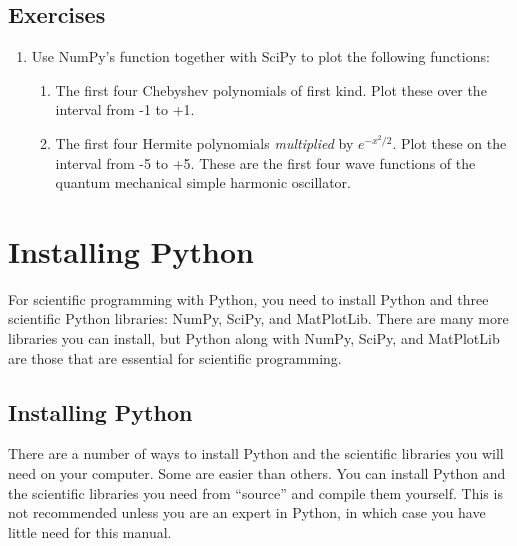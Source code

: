\documentclass[letterpaper,10pt,english]{sphinxmanual}
\begin{document}
\section{Exercises}
\label{chap9/chap9_scipy:exercises}\begin{enumerate}
\item {} 
Use NumPy's  function together with SciPy to plot the following functions:
\begin{enumerate}
\item {} 
The first four Chebyshev polynomials of first kind.  Plot these over the interval from -1 to +1.

\item {} 
The first four Hermite polynomials  \emph{multiplied} by \(e^{-x^2/2}\).  Plot these on the interval from -5 to +5.  These are the first four wave functions of the quantum mechanical simple harmonic oscillator.

\end{enumerate}

\end{enumerate}

\appendix
{}\label{apdx1/apdx1_install::doc}

\chapter{Installing Python}
\label{apdx1/apdx1_install:apdx1}\label{apdx1/apdx1_install:installing-python}
For scientific programming with Python, you need to install Python and three scientific Python libraries: NumPy, SciPy, and MatPlotLib.  There are many more libraries you can install, but Python along with NumPy, SciPy, and MatPlotLib are those that are essential for scientific programming.


\section{Installing Python}
\label{apdx1/apdx1_install:id1}
There are a number of ways to install Python and the scientific libraries you will need on your computer.  Some are easier than others.  You can install Python and the scientific libraries you need from ``source'' and compile them yourself.  This is not recommended unless you are an expert in Python, in which case you have little need for this manual.
\end{document}
